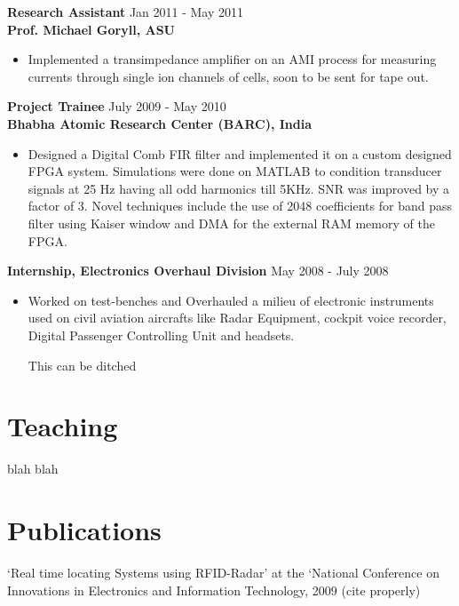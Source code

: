 \documentclass[margin]{res}
\begin{document}
\begin{resume}
{\bf Research Assistant} \hfill Jan 2011 - May 2011\\
{\bf Prof. Michael Goryll, ASU}
\begin{itemize}
	\item Implemented a transimpedance amplifier on an AMI process for measuring currents through single ion channels of cells, soon to be sent for tape out.
\end{itemize}
 
{\bf Project Trainee} \hfill July 2009 - May 2010\\
{\bf Bhabha Atomic Research Center (BARC), India}
\begin{itemize} 
	\item Designed a Digital Comb FIR filter and implemented it on a custom designed FPGA system. Simulations were done on MATLAB to condition transducer signals at 25 Hz having all odd harmonics till 5KHz. SNR was improved by a factor of 3. Novel techniques include the use of 2048 coefficients for band pass filter using Kaiser window and DMA for the external RAM memory of the FPGA.
\end{itemize} 

{\bf Internship, Electronics Overhaul Division} \hfill May 2008 - July 2008\\
\begin{itemize} 
	\item Worked on test-benches and Overhauled a milieu of electronic instruments used on civil aviation aircrafts like Radar Equipment, cockpit voice recorder, Digital Passenger Controlling Unit and headsets.
	
	This can be ditched 
\end{itemize}

\section{Teaching}
blah blah
\section{Publications}
‘Real time locating Systems using RFID-Radar’ at the ‘National Conference on Innovations in Electronics and Information Technology, 2009 (cite properly)


\end{resume}
\end{document}
